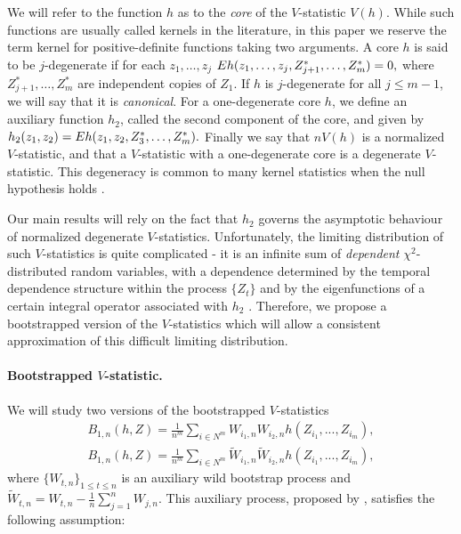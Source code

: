 We will refer to the function $h$ as to the \emph{core} of the $V$-statistic $V(h)$. While such functions are usually called kernels in the literature, in this paper we reserve the term kernel for positive-definite functions taking two arguments. A core $h$ is said to be $j$-degenerate if for each $z_1,\ldots,z_j$ $E h(z_1,\ldots , z_j , Z_{j+1}^*,\ldots ,Z_m^*) = 0,$ where $Z_{j+1}^*,\ldots,Z_m^*$ are independent copies of $Z_1$. If $h$ is $j$-degenerate for all $j\leq m-1$, we will say that it is \emph{canonical}. For a one-degenerate core $h$, we define an auxiliary function $h_2$, called the second component of the core, and given by $h_2(z_1,z_2) = E h(z_1,z_2, Z_3^*,\ldots, Z_m^*).$ Finally we say that $nV(h)$ is a normalized $V$-statistic, and that a $V$-statistic with a one-degenerate core is a degenerate $V$-statistic.  This degeneracy is common to many kernel statistics when the null hypothesis holds \cite{gretton2012kernel,gretton_kernel_2008,sejdinovic2013kernel}.

Our main results will rely on the fact that $h_2$ governs the asymptotic behaviour of normalized degenerate $V$-statistics. Unfortunately, the limiting distribution of such $V$-statistics is quite complicated - it is an infinite sum of \emph{dependent} $\chi^2$-distributed random variables, with a dependence  determined by the temporal dependence structure within the process $\{Z_t\}$ and by the eigenfunctions of a certain integral operator associated with $h_2$ \cite{i._s._borisov_orthogonal_2009,chwialkowski2014kernel}. Therefore, we propose a bootstrapped version of the $V$-statistics which will allow a consistent approximation of this difficult limiting distribution.  

\paragraph{Bootstrapped $V$-statistic.} 
We will study two versions of the bootstrapped $V$-statistics  
\begin{align}
 B_{1,n}(h,Z) = \frac{1}{n^m} \sum_{i \in N^m} \nolimits W_{i_1,n} W_{i_2,n} h(Z_{i_1},...,Z_{i_m}), \label{Vb1}\\ 
 B_{1,n}(h,Z) = \frac{1}{n^m} \sum_{i \in N^m}  \nolimits \tilde W_{i_1,n}  \tilde W_{i_2,n} h(Z_{i_1},...,Z_{i_m}),\label{Vb2}
\end{align}
where $\{W_{t,n}\}_{1 \leq t \leq n }$ is an auxiliary wild bootstrap process and $\tilde W_{t,n} = W_{t,n} - \frac 1 n \sum_{j=1}^n W_{j,n}$. This auxiliary process, proposed by \cite{Shao2010,leucht_dependent_2013}, satisfies the following assumption:

